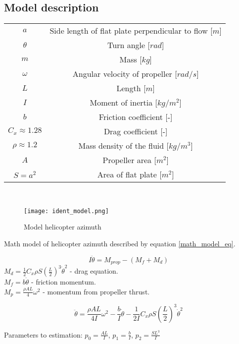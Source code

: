 \documentclass[../report.tex]{subfiles}
\begin{document}
\subsection{Model description}

\begin{tabular}{ |c|c| }
    \hline
    $a$ & Side length of flat plate perpendicular to flow [$m$]\\
    $\theta$ & Turn angle [$rad$]\\
    $m$ & Mass [$kg$]\\
    $\omega$ & Angular velocity of propeller [$rad/s$]\\
    $L$ & Length [$m$]\\
    $I$ & Moment of inertia [$kg/m^2$]\\
    $b$ & Friction coefficient [-]\\
    $C_x \approx 1.28$ & Drag coefficient [-]\\
    $\rho \approx 1.2$ & Mass density of the fluid [$kg/m^3$]\\
    $A$ & Propeller area [$m^2$]\\
    $S = a^2$ & Area of flat plate [$m^2$] \\
    \hline
\end{tabular} \\

\begin{figure}[htb!]
    \centering
    \texttt{[image: ident\_model.png]}
    \caption{Model helicopter azimuth}
    \label{fig:ident_model}
\end{figure}
Math model of helicopter azimuth described by equation \ref{math_model_eq}.

\begin{equation}
    I\ddot{\theta} = M_{prop} - (M_f + M_d)
\end{equation}
$M_d = \frac{1}{2}C_x \rho S \left(\frac{L}{2}\right)^3\dot{\theta}^2$ -  
drag equation.\\
$M_f =  b\dot{\theta}$ - friction momentum. \\
$M_p = \frac{\rho AL}{4}\omega^2$ - momentum from propeller thrust.


\begin{equation}\label{math_model_eq}
    \ddot{\theta} = \frac{\rho AL}{4I}\omega^2 - \frac{b}{I}\dot{\theta}
    - \frac{1}{2I}C_x \rho S \left(\frac{L}{2}\right)^3\dot{\theta}^2 
\end{equation}

Parameters to estimation:
$p_0 = \frac{AL}{I}$, $p_1 = \frac{b}{I}$, $p_2 = \frac{SL^3}{I}$
\end{document}
